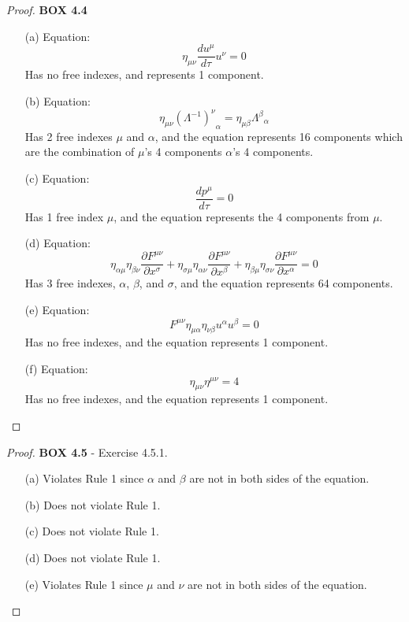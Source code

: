 \documentclass[11pt]{article}
\theoremstyle{definition}
\begin{document}
\begin{proof}{\textbf{BOX 4.4}}
\begin{itemize}
    \item [(a)] Equation:
    $$\eta_{\mu\nu}\frac{du^\mu}{d\tau} u^\nu = 0$$
    Has no free indexes, and represents 1 component.
    \item [(b)] Equation:
    $$\eta_{\mu\nu}{(\Lambda^{-1})^\nu}_\alpha = \eta_{\mu\beta}{\Lambda^\beta}_\alpha$$
    Has 2 free indexes $\mu$ and $\alpha$, and the equation represents 16
    components which are the combination of $\mu$'s 4 components $\alpha$'s 4 components.
    \item [(c)] Equation:
    $$\frac{dp^\mu}{d\tau} = 0$$
    Has 1 free index $\mu$, and the equation represents the 4 components from
    $\mu$.
    \item [(d)] Equation:
    $$\eta_{\alpha\mu}\eta_{\beta\nu}\frac{\partial F^{\mu\nu}}{\partial x^\sigma}
    + \eta_{\sigma\mu}\eta_{\alpha\nu}\frac{\partial F^{\mu\nu}}{\partial x^\beta}
    + \eta_{\beta\mu}\eta_{\sigma\nu}\frac{\partial F^{\mu\nu}}{\partial x^\alpha}
    = 0$$
    Has 3 free indexes, $\alpha$, $\beta$, and $\sigma$,
    and the equation represents 64 components.
    \item [(e)] Equation:
    $$F^{\mu\nu}\eta_{\mu\alpha}\eta_{\nu\beta}u^\alpha u^\beta = 0$$
    Has no free indexes, and the equation represents 1 component.
    \item [(f)] Equation:
    $$\eta_{\mu\nu}\eta^{\mu\nu} = 4$$
    Has no free indexes, and the equation represents 1 component.
\end{itemize}
\end{proof}
\begin{proof}{\textbf{BOX 4.5} - Exercise 4.5.1.}
    \begin{itemize}
        \item [(a)] Violates Rule 1 since $\alpha$ and $\beta$ are not in
        both sides of the equation.
        \item [(b)] Does not violate Rule 1.
        \item [(c)] Does not violate Rule 1.
        \item [(d)] Does not violate Rule 1.
        \item [(e)] Violates Rule 1 since $\mu$ and $\nu$ are not in
        both sides of the equation.
    \end{itemize}
\end{proof}
\cleardoublepage
\end{document}
